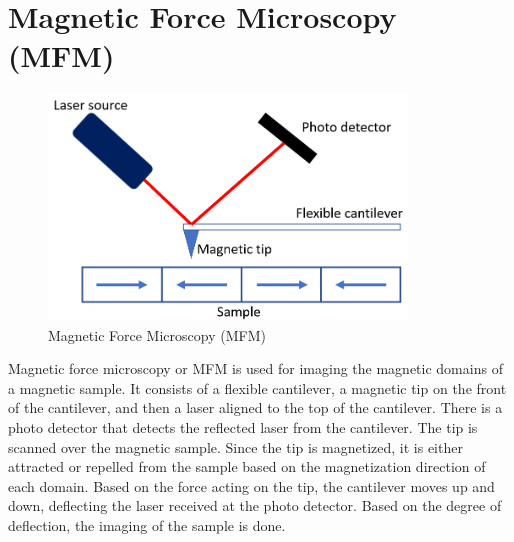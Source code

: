 \documentclass[12pt,a4paper,bold]{thesis}
\theoremstyle{thm}
\theoremstyle{definition}
\begin{document}
\section{Magnetic Force Microscopy (MFM)}
\begin{figure}[H]
	\centering
   \includegraphics[height=6cm]{Images/53.png} 
   \caption{Magnetic Force Microscopy (MFM)}
\end{figure}
Magnetic force microscopy or MFM is used for imaging the magnetic domains of a magnetic sample.
It consists of a flexible cantilever, a magnetic tip on the front of the cantilever, and then a laser aligned to the top of the cantilever. There is a photo detector that detects the reflected laser from the cantilever. The tip is scanned over the magnetic sample. Since the tip is magnetized, it is either attracted or repelled from the sample based on the magnetization direction of each domain. Based on the force acting on the tip, the cantilever moves up and down, deflecting the laser received at the photo detector. Based on the degree of deflection, the imaging of the sample is done.
\end{document}
